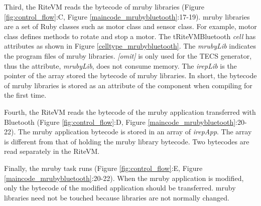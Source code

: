 \documentclass{sig-alternate-05-2015}
\begin{document}
Third, the RiteVM reads the bytecode of mruby libraries (Figure \ref{fig:control_flow}:C, Figure \ref{maincode_mrubybluetooth}:17-19).
mruby libraries are a set of Ruby classes such as motor class and sensor class.
For example, motor class defines methods to rotate and stop a motor.
The tRiteVMBluetooth {\it cell} has attributes as shown in Figure \ref{celltype_mrubybluetooth}.
The {\it mrubyLib} indicates the program files of mruby libraries.
{\it [omit]} is only used for the TECS generator, thus the attribute, {\it mrubyLib}, does not consume memory.
The {\it irepLib} is the pointer of the array stored the bytecode of mruby libraries.
In short, the bytecode of mruby libraries is stored as an attribute of the component when compiling for the first time.


Fourth, the RiteVM reads the bytecode of the mruby application transferred with Bluetooth (Figure \ref{fig:control_flow}:D, Figure \ref{maincode_mrubybluetooth}:20-22).
The mruby application bytecode is stored in an array of {\it irepApp}.
The array is different from that of holding the mruby library bytecode.
Two bytecodes are read separately in the RiteVM.

Finally, the mruby task runs (Figure \ref{fig:control_flow}:E, Figure \ref{maincode_mrubybluetooth}:20-22).
When the mruby application is modified, only the bytecode of the modified application should be transferred.
mruby libraries need not be touched because libraries are not normally changed.
\end{document}
